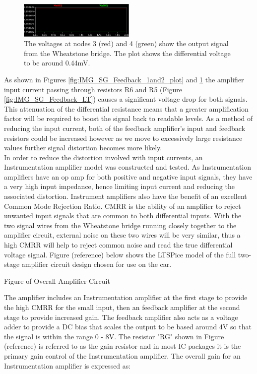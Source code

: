 \begin{figure}[h!]
	\centering
	\includegraphics[width=0.5\textwidth]{Images/Strain_Gauges/IMG_SG_Feedback_3and4_plot.png}
	\caption{The voltages at nodes 3 (red) and 4 (green) show the output signal from the Wheatstone bridge. The plot shows the differential voltage to be around 0.44mV.}
	\label{fig:IMG_SG_Feedback_3and4_plot}
\end{figure}

As shown in Figures \ref{fig:IMG_SG_Feedback_1and2_plot} and \ref{fig:IMG_SG_Feedback_3and4_plot} the amplifier input current passing through resistors R6 and R5 (Figure \ref{fig:IMG_SG_Feedback_LT}) causes a significant voltage drop for both signals. This attenuation of the differential resistance means that a greater amplification factor will be required to boost the signal back to readable levels. As a method of reducing the input current, both of the feedback amplifier's input and feedback resistors could be increased however as we move to excessively large resistance values further signal distortion becomes more likely.\\

In order to reduce the distortion involved with input currents, an Instrumentation amplifier model was constructed and tested. As Instrumentation amplifiers have an op amp for both positive and negative input signals, they have a very high input impedance, hence limiting input current and reducing the associated distortion. Instrument amplifiers also have the benefit of an excellent Common Mode Rejection Ratio. CMRR is the ability of an amplifier to reject unwanted input signals that are common to both differential inputs. With the two signal wires from the Wheatstone bridge running closely together to the amplifier circuit, external noise on these two wires will be very similar, thus a high CMRR will help to reject common noise and read the true differential voltage signal. Figure (reference) below shows the LTSPice model of the full two-stage amplifier circuit design chosen for use on the car. 

Figure of Overall Amplifier Circuit

The amplifier includes an Instrumentation amplifier at the first stage to provide the high CMRR for the small input, then an feedback amplifier at the second stage to provide increased gain. The feedback amplifier also acts as a voltage adder to provide a DC bias that scales the output to be based around 4V so that the signal is within the range 0 - 8V. The resistor "RG" shown in Figure (reference) is referred to as the gain resistor and in most IC packages it is the primary gain control of the Instrumentation amplifier. The overall gain for an Instrumentation amplifier is expressed as:

